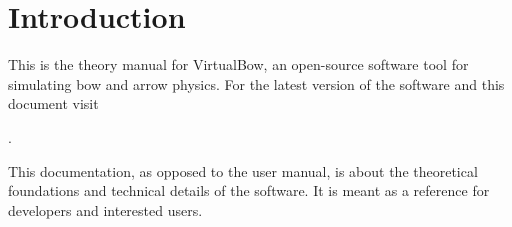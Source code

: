 \chapter{Introduction}

This is the theory manual for VirtualBow, an open-source software tool for simulating bow and arrow physics.
For the latest version of the software and this document visit

\website.

This documentation, as opposed to the user manual, is about the theoretical foundations and technical details of the software.
It is meant as a reference for developers and interested users.